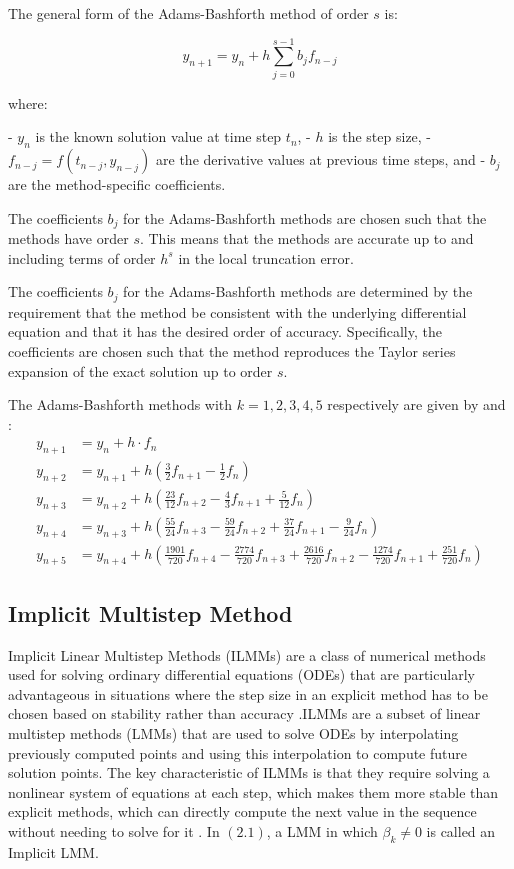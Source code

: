 The general form of the Adams-Bashforth method of order $s$ is:

\[
y_{n+1} = y_n + h \sum_{j=0}^{s-1} b_j f_{n-j}
\]

where:

- $y_n$ is the known solution value at time step $t_n$,
- $h$ is the step size,
- $f_{n-j} = f(t_{n-j}, y_{n-j})$ are the derivative values at previous time steps, and
- $b_j$ are the method-specific coefficients.

The coefficients $b_j$ for the Adams-Bashforth methods are chosen such that the methods have order $s$. This means that the methods are accurate up to and including terms of order $h^s$ in the local truncation error.

The coefficients $b_j$ for the Adams-Bashforth methods are determined by the requirement that the method be consistent with the underlying differential equation and that it has the desired order of accuracy. Specifically, the coefficients are chosen such that the method reproduces the Taylor series expansion of the exact solution up to order $s$.

The Adams-Bashforth methods with $k=1,2,3,4,5$ respectively are given by \cite{butcher2003numerical} and \cite{hairer1993solving}:
\begin{align*}
  y_{n+1} & = y_n + h \cdot f_n \\
  y_{n+2} & = y_{n+1} + h \left(\frac{3}{2}f_{n+1} - \frac{1}{2}f_{n}\right) \\
  y_{n+3} & = y_{n+2} + h \left(\frac{23}{12}f_{n+2} - \frac{4}{3}f_{n+1} + \frac{5}{12}f_{n}\right) \\
  y_{n+4} & = y_{n+3} + h \left(\frac{55}{24}f_{n+3} - \frac{59}{24}f_{n+2} + \frac{37}{24}f_{n+1} - \frac{9}{24}f_{n}\right) \\
  y_{n+5} & = y_{n+4} + h \left(\frac{1901}{720}f_{n+4} - \frac{2774}{720}f_{n+3} + \frac{2616}{720}f_{n+2} - \frac{1274}{720}f_{n+1} + \frac{251}{720}f_{n}\right)
\end{align*}


\subsection{Implicit Multistep Method}
Implicit Linear Multistep Methods (ILMMs) are a class of numerical methods used for solving ordinary differential equations (ODEs) that are particularly advantageous in situations where the step size in an explicit method has to be chosen based on stability rather than accuracy \cite{alexander}.ILMMs are a subset of linear multistep methods (LMMs) that are used to solve ODEs by interpolating previously computed points and using this interpolation to compute future solution points. The key characteristic of ILMMs is that they require solving a nonlinear system of equations at each step, which makes them more stable than explicit methods, which can directly compute the next value in the sequence without needing to solve for it \cite{keller2020discovery}. In $(2.1)$, a LMM in which $\beta_k \neq 0$ is called an Implicit LMM.


